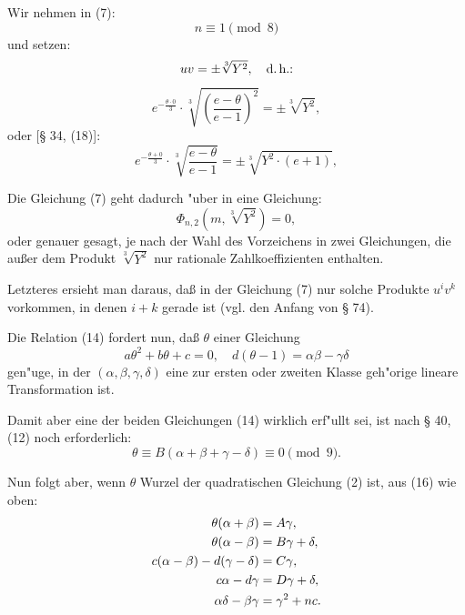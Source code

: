 \documentclass[12pt,a4paper]{article}
\theoremstyle{plain}
\theoremstyle{definition}
\theoremstyle{remark}
\begin{document}
Wir nehmen in (7):
\begin{equation}\label{eq:13}
n \equiv 1 \pmod{8}
\end{equation}
und setzen:
\[
uv = \pm \sqrt[3]{Y^2}, \quad \text{d.\,h.:}
\]
\[
e^{-\frac{\theta \cdot 0}{3}} \cdot \sqrt[3]{\left(\frac{e-\theta}{e-1}\right)^2} = \pm \sqrt[3]{Y^2},
\]
oder [\S{} 34, (18)]:
\begin{equation}\label{eq:14}
e^{-\frac{\theta+0}{3}} \cdot \sqrt[3]{\frac{e-\theta}{e-1}} = \pm \sqrt[3]{Y^2 \cdot (e+1)},
\end{equation}

Die Gleichung (7) geht dadurch "uber in eine Gleichung:
\begin{equation}\label{eq:15}
\Phi_{n,2}(m, \sqrt[3]{Y^2}) = 0,
\end{equation}
oder genauer gesagt, je nach der Wahl des Vorzeichens in zwei Gleichungen, die au\ss{}er dem Produkt $\sqrt[3]{Y^2}$ nur rationale Zahlkoeffizienten enthalten.

Letzteres ersieht man daraus, da\ss{} in der Gleichung (7) nur solche Produkte $u^i v^k$ vorkommen, in denen $i+k$ gerade ist (vgl. den Anfang von \S{} 74).

Die Relation (14) fordert nun, da\ss{} $\theta$ einer Gleichung
\begin{equation}\label{eq:16}
a\theta^2 + b\theta + c = 0, \quad d(\theta - 1) = \alpha\beta - \gamma\delta
\end{equation}
gen"uge, in der $(\alpha, \beta, \gamma, \delta)$ eine zur ersten oder zweiten Klasse geh"orige lineare Transformation ist.

Damit aber eine der beiden Gleichungen (14) wirklich erf"ullt sei, ist nach \S{} 40, (12) noch erforderlich:
\begin{equation}\label{eq:17}
\theta \equiv B(\alpha + \beta + \gamma - \delta) \equiv 0 \pmod{9}.
\end{equation}

Nun folgt aber, wenn $\theta$ Wurzel der quadratischen Gleichung (2) ist, aus (16) wie oben:
\begin{align}
\theta(\alpha + \beta) &= A\gamma, \notag\\
\theta(\alpha - \beta) &= B\gamma + \delta, \notag\\
c(\alpha - \beta) - d(\gamma - \delta) &= C\gamma, \notag\\
\label{eq:18}
c\alpha - d\gamma &= D\gamma + \delta, \notag\\
\alpha\delta - \beta\gamma &= \gamma^2 + nc.
\end{align}
\end{document}
